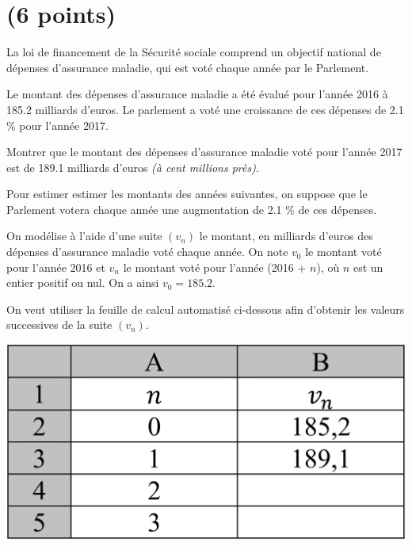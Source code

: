 \section{(6 points)}\label{ex:secu}

La loi de financement de la Sécurité sociale comprend un objectif national de dépenses d'assurance maladie, qui est voté chaque année par le Parlement.

Le montant des dépenses d'assurance maladie a été évalué pour l'année 2016 à \num{185.2} milliards d'euros. Le parlement a voté une croissance de ces dépenses de \num{2.1} \% pour l'année 2017.



\begin{questions}
	\question Montrer que le montant des dépenses  d'assurance maladie voté pour l'année 2017 est de \num{189.1} milliards d'euros \emph{(à cent millions près)}.
	
	
	
\end{questions}



Pour estimer estimer les montants des années suivantes, on suppose que le Parlement votera chaque année une augmentation de \num{2.1} \% de ces dépenses.

On modélise à l'aide d'une suite $(v_n)$ le montant, en milliards d'euros des dépenses d'assurance maladie voté chaque année. On note $v_0$ le montant voté pour l'année 2016 et $v_n$ le montant voté pour l'année (2016 + $n$), où $n$ est un entier positif ou nul. On a ainsi $v_0 = \num{185.2}$.


 On veut utiliser la feuille de calcul automatisé ci-dessous afin d'obtenir les valeurs successives de la suite $(v_n)$.
 
 \begin{center}
 	\includegraphics[scale=0.2]{img/secu}
 \end{center}

